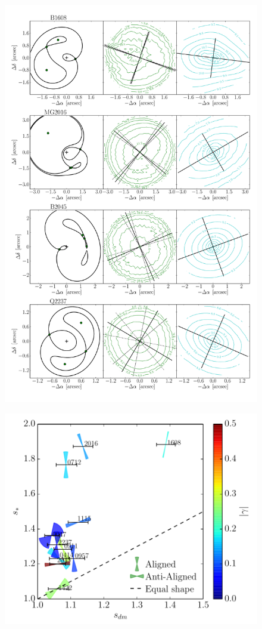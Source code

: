 \documentclass[useAMS,usenatbib]{mn2e}
\begin{document}
\begin{figure}
  \centering
  \includegraphics[width=.8\linewidth]{Figures/AllLenses33.pdf}
  \caption[width=.65\linewidth]{}
  \label{fig:lensreconstruction2}
\end{figure}

\begin{figure}
  \centering
  \includegraphics[width=\linewidth]{Figures/wedges_shears.pdf}
  \caption[width=.65\linewidth]{}
  \label{fig:wedges}
\end{figure}
\end{document}
